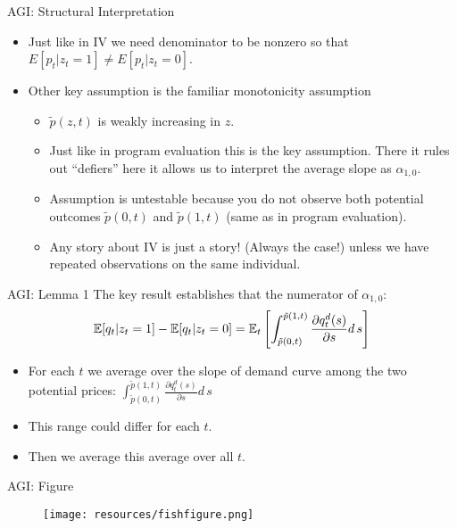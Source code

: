 \begin{frame}{AGI: Structural Interpretation}
\begin{itemize}
\item Just like in IV we need denominator to be nonzero so that
$E[p_t | z_t=1] \neq E[p_t | z_t = 0]$.
\item Other key assumption is the familiar \alert{monotonicity} assumption
\begin{itemize}
\item $\tilde{p}(z,t)$ is weakly increasing in $z$.
\item Just like in program evaluation this is the key assumption. There it rules out ``defiers'' here it allows us to interpret the \alert{average slope} as $\alpha_{1,0}$.
\item Assumption is untestable because you do not observe both potential outcomes $\tilde{p}(0,t)$ and $\tilde{p}(1,t)$ (same as in program evaluation).
\item Any story about IV is just a story! (Always the case!) unless we have repeated observations on the same individual.
\end{itemize}
\end{itemize}
\end{frame}


\begin{frame}{AGI: Lemma 1}
The key result establishes that the numerator of $\alpha_{1,0}$:
\begin{eqnarray*}
\mathbb{E}[q_t | z_t =1] - \mathbb{E}[q_t | z_t = 0] = \mathbb{E}_t \left[\int_{\tilde{p}(0,t)}^{\tilde{p}(1,t)} \frac{\partial q_t^d(s)}{\partial s}{d\, s} \right]
\end{eqnarray*}
\begin{itemize}
\item For each $t$ we average over the slope of demand curve among the two potential prices: $\int_{\tilde{p}(0,t)}^{\tilde{p}(1,t)} \frac{\partial q_t^d(s)}{\partial s}{d\, s}$ 
\item This range could differ for each $t$.
\item Then we average this average over all $t$.
\end{itemize}
\end{frame}

\begin{frame}{AGI: Figure}
\begin{figure}
\begin{center}
\texttt{[image: resources/fishfigure.png]}
\end{center}
\end{figure}
\end{frame}


